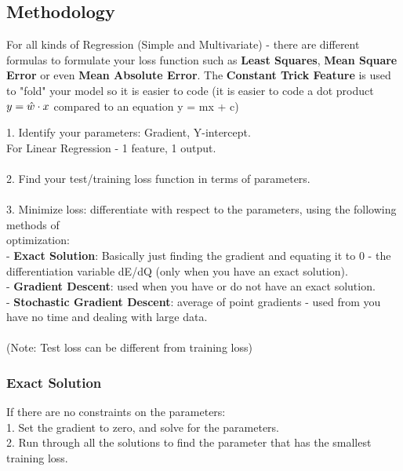 \documentclass[a4paper]{article}
\begin{document}
\subsection{Methodology}

For all kinds of Regression (Simple and Multivariate) - there are different formulas to formulate your loss function such as \textbf{Least Squares}, \textbf{Mean Square Error} or even \textbf{Mean Absolute Error}. The \textbf{Constant Trick Feature} is used to "fold" your model so it is easier to code (it is easier to code a dot product $y = \Hat{w}\cdot x$ compared to an equation y = mx + c)

1. Identify your parameters: Gradient, Y-intercept. \\For Linear Regression - 1 feature, 1 output. \\ \\
2. Find your test/training loss function in terms of parameters. \\ \\
3. Minimize loss: differentiate with respect to the parameters, using the following methods of \\ optimization: \\
 - \textbf{Exact Solution}: Basically just finding the gradient and equating it to 0 - the differentiation variable dE/dQ (only when you have an exact solution). \\
 - \textbf{Gradient Descent}: used when you have or do not have an exact solution. \\
 - \textbf{Stochastic Gradient Descent}: average of point gradients - used from you have no time and dealing with large data. \\ \\
(Note: Test loss can be different from training loss)

\subsubsection{Exact Solution}
If	there	are	no	constraints	on	the	parameters: \\
1. Set	the	gradient	to	zero,	and	solve	for	the	
parameters.\\
2. Run	through	all	the	solutions	to	find	the	
parameter	that	has	the	smallest	training	loss.
\end{document}
